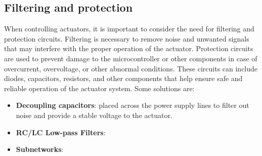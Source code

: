 \subsection{Filtering and protection}
When controlling actuators, it is important to consider the need for filtering
and protection circuits. Filtering is necessary to remove noise and unwanted
signals that may interfere with the proper operation of the actuator.
Protection circuits are used to prevent damage to the microcontroller or other
components in case of overcurrent, overvoltage, or other abnormal conditions.
These circuits can include diodes, capacitors, resistors, and other components
that help ensure safe and reliable operation of the actuator system.
Some solutions are:
\begin{itemize}
    \item \textbf{Decoupling capacitors}: placed across the power supply lines to filter out noise and provide a
          stable voltage to the actuator.
    \item \textbf{RC/LC Low-pass Filters}:
    \item \textbf{Subnetworks}:
\end{itemize}
      